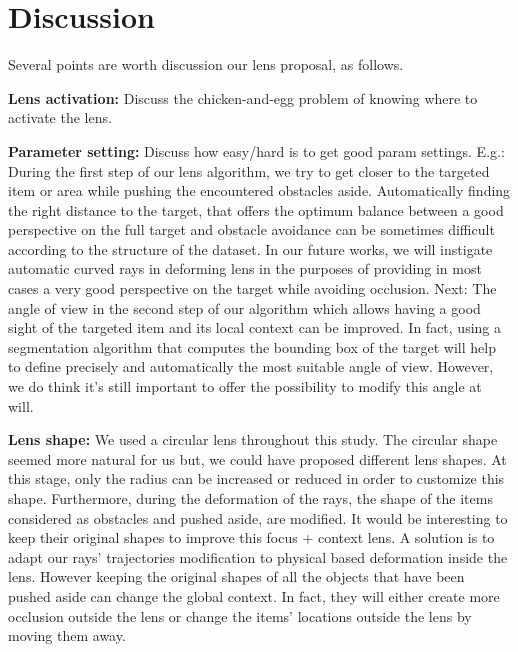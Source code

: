\section{Discussion}
\label{sec:discussion}
%
%
Several points are worth discussion our lens proposal, as follows.

\noindent\textbf{Lens activation:} Discuss the chicken-and-egg problem of knowing where to activate the lens.

\vspace{0.15cm}
\noindent\textbf{Parameter setting:} Discuss how easy/hard is to get good param settings. E.g.: During the first step of our lens algorithm, we try to get closer to the targeted item or area while pushing the encountered obstacles aside. Automatically finding the right distance to the target, that offers the optimum balance between a good perspective on the full target and obstacle avoidance can be sometimes difficult according to the structure of the dataset. In our future works, we will instigate automatic curved rays in deforming lens in the purposes of providing in most cases a very good perspective on the target while avoiding occlusion. Next: The angle of view in the second step of our algorithm which allows having a good sight of the targeted item and its local context can be improved. In fact, using a segmentation algorithm that computes the bounding box of the target will help to define precisely and automatically the most suitable angle of view. However, we do think it's still important to offer the possibility to modify this angle at will.

\noindent\textbf{Lens shape:} We used a circular lens throughout this study. The circular shape seemed more natural for us but, we could have proposed different lens shapes. At this stage, only the radius can be increased or reduced in order to customize this shape. Furthermore, during the deformation of the rays, the shape of the items considered as obstacles and pushed aside, are modified. It would be interesting to keep their original shapes to improve this focus + context lens. A solution is to adapt our rays' trajectories modification to physical based deformation inside the lens. However keeping the original shapes of all the objects that have been pushed aside can change the global context. In fact, they will either create more occlusion outside the lens or change the items' locations outside the lens by moving them away.

